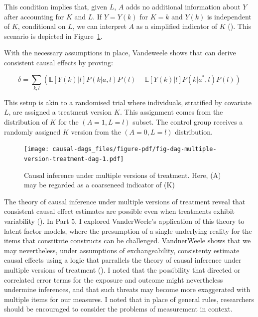 \documentclass[
  singlecolumn,
  9pt]{article}
\begin{document}
This condition implies that, given \(L\), \(A\) adds no additional
information about \(Y\) after accounting for \(K\) and \(L\). If
\(Y = Y(k)\) for \(K = k\) and \(Y(k)\) is independent of \(K\),
conditional on \(L\), we can interpret \(A\) as a simplified indicator
of \(K\) ().
This scenario is depicted in
Figure~\ref{fig-dag-multiple-version-treatment-dag}.

With the necessary assumptions in place, Vandeweele shows that can
derive consistent causal effects by proving:

\[\delta = \sum_{k,l} \left( \mathbb{E}[Y(k)|l] P(k|a,l) P(l) - \mathbb{E}[Y(k)|l] P(k|a^*,l) P(l) \right) \]

This setup is akin to a randomised trial where individuals, stratified
by covariate \(L\), are assigned a treatment version \(K\). This
assignment comes from the distribution of \(K\) for the
\((A = 1, L = l)\) subset. The control group receives a randomly
assigned \(K\) version from the \((A = 0, L = l)\) distribution.

\begin{figure}

{\centering \texttt{[image: causal-dags\_files/figure-pdf/fig-dag-multiple-version-treatment-dag-1.pdf]}

}

\caption{\label{fig-dag-multiple-version-treatment-dag}Causal inference
under multiple versions of treatment. Here, (A) may be regarded as a
coarseneed indicator of (K)}

\end{figure}

The theory of causal inference under multiple versions of treatment
reveal that consistent causal effect estimates are possible even when
treatments exhibit variability
(). In Part
5, I explored VanderWeele's application of this theory to latent factor
models, where the presumption of a single underlying reality for the
items that constitute constructs can be challenged. VandnerWeele shows
that we may nevertheless, under assumptions of exchangeability,
consistenty estimate causal effects using a logic that parrallels the
theory of causal inference under multiple versions of treatment
(). I noted that the
possibility that directed or correlated error terms for the exposure and
outcome might nevertheless undermine inferences, and that such threats
may become more exaggerated with multiple items for our measures. I
noted that in place of general rules, researchers should be encouraged
to consider the problems of measurement in context.
\end{document}
